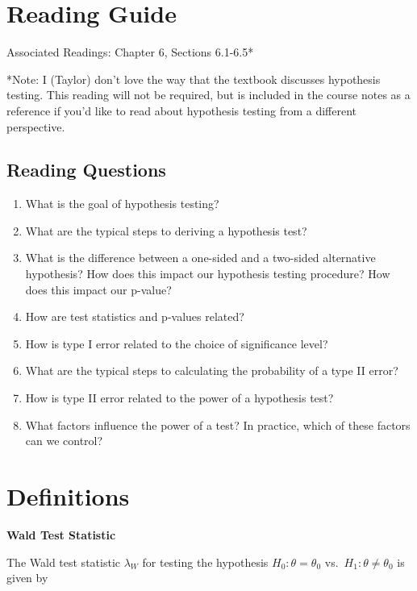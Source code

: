 \documentclass[
  letterpaper,
  DIV=11,
  numbers=noendperiod]{scrreprt}
\providecommand{\tightlist}{%
  \setlength{\itemsep}{0pt}\setlength{\parskip}{0pt}}\usepackage{longtable,booktabs,array}
\begin{document}
\hypertarget{reading-guide-6}{%
\section{Reading Guide}\label{reading-guide-6}}

Associated Readings: Chapter 6, Sections 6.1-6.5*

*Note: I (Taylor) don't love the way that the textbook discusses
hypothesis testing. This reading will not be required, but is included
in the course notes as a reference if you'd like to read about
hypothesis testing from a different perspective.

\hypertarget{reading-questions-6}{%
\subsection{Reading Questions}\label{reading-questions-6}}

\begin{enumerate}
\def\labelenumi{\arabic{enumi}.}
\tightlist
\item
  What is the goal of hypothesis testing?
\item
  What are the typical steps to deriving a hypothesis test?
\item
  What is the difference between a one-sided and a two-sided alternative
  hypothesis? How does this impact our hypothesis testing procedure? How
  does this impact our p-value?
\item
  How are test statistics and p-values related?
\item
  How is type I error related to the choice of significance level?
\item
  What are the typical steps to calculating the probability of a type II
  error?
\item
  How is type II error related to the power of a hypothesis test?
\item
  What factors influence the power of a test? In practice, which of
  these factors can we control?
\end{enumerate}

\hypertarget{definitions-6}{%
\section{Definitions}\label{definitions-6}}

\textbf{Wald Test Statistic}

The Wald test statistic \(\lambda_W\) for testing the hypothesis
\(H_0: \theta = \theta_0\) vs.~\(H_1: \theta \neq \theta_0\) is given by
\end{document}
